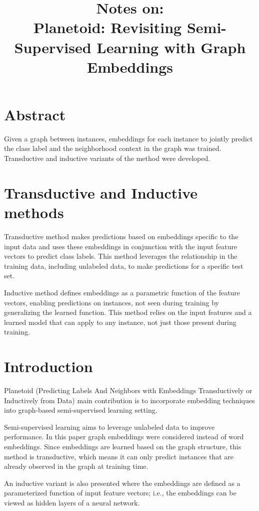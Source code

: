 \documentclass{article}
\title{\textbf{Notes on:}\\ Planetoid: Revisiting Semi-Supervised Learning with Graph Embeddings}
\begin{document}
\maketitle{}

\section{Abstract}
Given a graph between instances, embeddings for each instance to jointly
predict the class label and the neighborhood context in the graph was trained.
Transductive and inductive variants of the method were developed.

\section{Transductive and Inductive methods}
Transductive method makes predictions based on embeddings specific to the input
data and uses these embeddings in conjunction with the input feature vectors to
predict class labels. This method leverages the relationship in the training
data, including unlabeled data, to make predictions for a specific test set.

Inductive method defines embeddings as a parametric function of the feature
vectors, enabling predictions on instances, not seen during training by
generalizing the learned function. This method relies on the input features and
a learned model that can apply to any instance, not just those present during
training.

\section{Introduction}
Planetoid (Predicting Labels And Neighbors with Embeddings Transductively or
Inductively from Data) main contribution is to incorporate embedding techniques
into graph-based semi-supervised learning setting. 

Semi-supervised learning aims to leverage unlabeled data to improve
performance. In this paper graph embeddings were considered instead of word
embeddings. Since embeddings are learned based on the graph structure, this
method is transductive, which means it can only predict instances that are
already observed in the graph at training time.

An inductive variant is also presented where the embeddings are defined as a
parameterized function of input feature vectors; i.e., the embeddings can be
viewed as hidden layers of a neural network.
\end{document}
